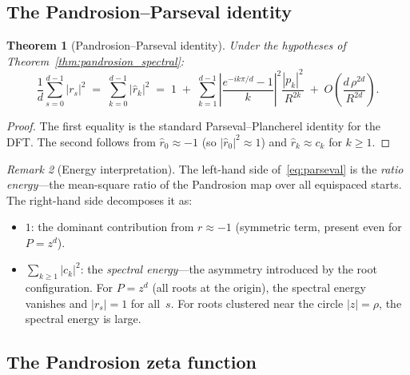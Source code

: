 \documentclass[10pt,a4paper,oneside]{book}
\newtheorem{theorem}{Theorem}[chapter]
\theoremstyle{definition}
\theoremstyle{remark}
\newtheorem{remark}[theorem]{Remark}
\begin{document}
\subsection{The Pandrosion--Parseval identity}
\label{sec:parseval}

\begin{theorem}[Pandrosion--Parseval identity]
\label{thm:pandrosion_parseval}
Under the hypotheses of Theorem~\ref{thm:pandrosion_spectral}:
\begin{equation}
\label{eq:parseval}
  \frac{1}{d}\sum_{s=0}^{d-1} |r_s|^2
  \;=\; \sum_{k=0}^{d-1} |\hat{r}_k|^2
  \;=\; 1 \;+\; \sum_{k=1}^{d-1}\left|\frac{e^{-ik\pi/d} - 1}{k}\right|^2 \frac{|p_k|^2}{R^{2k}}
  \;+\; O\!\left(\frac{d\,\rho^{2d}}{R^{2d}}\right).
\end{equation}
\end{theorem}

\begin{proof}
The first equality is the standard Parseval--Plancherel identity for the DFT.  The second follows from $\hat{r}_0 \approx -1$ (so $|\hat{r}_0|^2 \approx 1$) and $\hat{r}_k \approx c_k$ for $k \geq 1$.
\end{proof}

\begin{remark}[Energy interpretation]
The left-hand side of~\eqref{eq:parseval} is the \emph{ratio energy}---the mean-square ratio of the Pandrosion map over all equispaced starts.  The right-hand side decomposes it as:
\begin{itemize}[nosep]
  \item $1$: the dominant contribution from $r \approx -1$ (symmetric term, present even for $P = z^d$).
  \item $\sum_{k \geq 1}|c_k|^2$: the \emph{spectral energy}---the asymmetry introduced by the root configuration.  For $P = z^d$ (all roots at the origin), the spectral energy vanishes and $|r_s| = 1$ for all~$s$.  For roots clustered near the circle $|z| = \rho$, the spectral energy is large.
\end{itemize}
\end{remark}

\subsection{The Pandrosion zeta function}
\label{sec:pandrosion_zeta}
\end{document}
